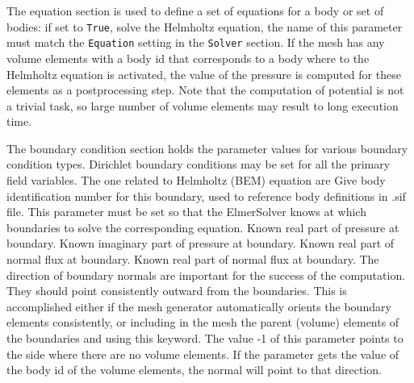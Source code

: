 The equation section is used to define a set of equations for a body or set of bodies:
\sifbegin
{} if set to {\tt True}, solve the Helmholtz equation,
the name of this parameter must match the {\tt Equation} setting in the {\tt Solver} section.
\sifend
If the mesh has any volume elements with a body id that corresponds to a body where to
the Helmholtz equation is activated, the value of the pressure is computed for these elements
as a postprocessing step. Note that the computation of potential is not a trivial task,
so large number of volume elements may result to long execution time.

The boundary condition section holds the parameter values for various
boundary condition types. Dirichlet boundary conditions may be
set for all the primary field variables. The one related to Helmholtz (BEM) equation
are
\sifbegin
{}
Give body identification number for this boundary, used to reference
body definitions in .sif file. This parameter must be set so that the ElmerSolver
knows at which boundaries to solve the corresponding equation.
Known real part of pressure at boundary.
Known imaginary part of pressure at boundary.
Known real part of normal flux at boundary.
Known real part of normal flux at boundary.
The direction of boundary normals are important for the success of the computation. They
should point consistently outward from the boundaries. This is accomplished either if
the mesh generator automatically orients the boundary elements consistently, or including
in the mesh the parent (volume) elements of the boundaries and using this keyword. The value
-1 of this parameter points to the side where there are no volume elements. If the parameter
gets the value of the body id of the volume elements, the normal will point to that direction.
\sifend

\sifend


%
%

